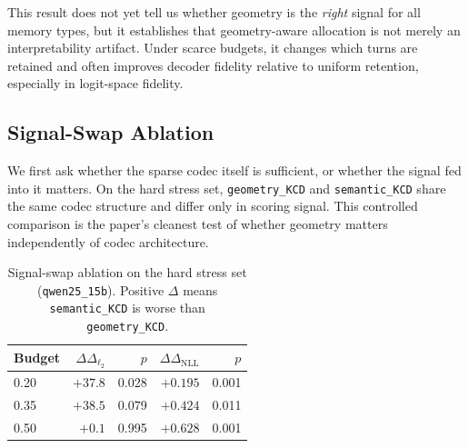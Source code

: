\documentclass[11pt]{article}
\newcommand{\Logit}{\Delta_{\ell_2}}
\newcommand{\NLL}{\Delta_{\mathrm{NLL}}}
\newcommand{\pname}[1]{\texttt{\small #1}}
\begin{document}
\begin{table}[t]
\centering
\caption{Geometry-aware control vs.\ uniform retention on the hard stress set. Negative deltas favor geometry.}
\label{tab:geometry_vs_uniform}
\end{table}

This result does not yet tell us whether geometry is the \emph{right} signal for all memory types, but it establishes that geometry-aware allocation is not merely an interpretability artifact. Under scarce budgets, it changes which turns are retained and often improves decoder fidelity relative to uniform retention, especially in logit-space fidelity.

\subsection{Signal-Swap Ablation}
We first ask whether the sparse codec itself is sufficient, or whether the signal fed into it matters. On the hard stress set, \pname{geometry\_KCD} and \pname{semantic\_KCD} share the same codec structure and differ only in scoring signal. This controlled comparison is the paper's cleanest test of whether geometry matters independently of codec architecture.

\begin{table}[t]
\centering
\caption{Signal-swap ablation on the hard stress set (\pname{qwen25\_15b}). Positive $\Delta$ means \pname{semantic\_KCD} is worse than \pname{geometry\_KCD}.}
\label{tab:signal_swap}
\begin{tabular}{lrrrr}
\toprule
Budget & $\Delta\Logit$ & $p$ & $\Delta\NLL$ & $p$ \\
\midrule
0.20 & $+37.8$ & 0.028 & $+0.195$ & 0.001 \\
0.35 & $+38.5$ & 0.079 & $+0.424$ & 0.011 \\
0.50 & $+0.1$ & 0.995 & $+0.628$ & 0.001 \\
\bottomrule
\end{tabular}
\end{table}
\end{document}
